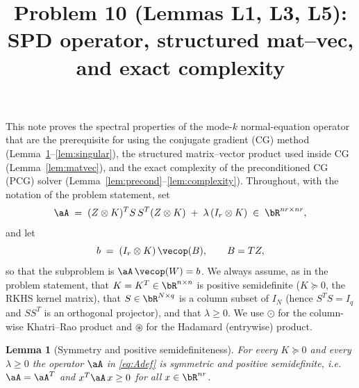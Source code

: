 
\usepackage{amsthm}
\usepackage{algorithm}
\usepackage{algpseudocode}
\newtheorem{lemma}{Lemma}
\newtheorem{theorem}{Theorem}
\newtheorem{remark}{Remark}

\title{Problem 10 (Lemmas L1, L3, L5): SPD operator, structured mat--vec, and exact complexity}
\date{}


\maketitle

\noindent
This note proves the spectral properties of the mode-$k$ normal-equation
operator that are the prerequisite for using the conjugate gradient (CG)
method (Lemma~\ref{lem:psd}--\ref{lem:singular}), the structured
matrix--vector product used inside CG (Lemma~\ref{lem:matvec}), and the exact
complexity of the preconditioned CG (PCG) solver
(Lemma~\ref{lem:precond}--\ref{lem:complexity}).  Throughout, with the notation
of the problem statement, set
\begin{equation}\label{eq:Adef}
  \aA \;=\; (Z\otimes K)^{T} S\, S^{T} (Z\otimes K)\;+\;\lambda\,(I_r\otimes K)
  \;\in\;\bR^{nr\times nr},
\end{equation}
and let
\begin{equation}\label{eq:rhs}
  b \;=\; (I_r\otimes K)\,\vecop(B),\qquad B = TZ,
\end{equation}
so that the subproblem is $\aA\,\vecop(W)=b$. We always assume, as in the
problem statement, that $K=K^{T}\in\bR^{n\times n}$ is positive semidefinite
($K\succeq0$, the RKHS kernel matrix), that $S\in\bR^{N\times q}$ is a column
subset of $I_N$ (hence $S^{T}S=I_q$ and $SS^{T}$ is an orthogonal projector),
and that $\lambda\ge0$.  We use $\odot$ for the column-wise Khatri--Rao product
and $\circledast$ for the Hadamard (entrywise) product.

\bigskip

\begin{lemma}[Symmetry and positive semidefiniteness]\label{lem:psd}
For every $K\succeq0$ and every $\lambda\ge0$ the operator $\aA$ in
\eqref{eq:Adef} is symmetric and positive semidefinite, i.e.
$\aA=\aA^{T}$ and $x^{T}\aA\,x\ge0$ for all $x\in\bR^{nr}$.
\end{lemma}

